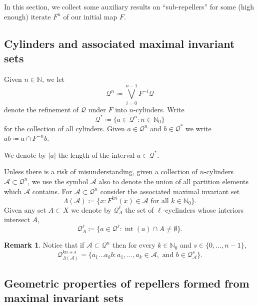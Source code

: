 \documentclass[english, 10pt]{amsart}
\numberwithin{equation}{section}
\theoremstyle{definition}
\theoremstyle{plain}
\theoremstyle{plain}
\theoremstyle{definition}
\newtheorem{remark}[definition]{Remark}
\theoremstyle{definition}
\theoremstyle{plain}
\theoremstyle{definition}
\newcommand{\cA}{{\mathcal A}}
\newcommand{\cQ}{{\mathcal Q}}
\newcommand{\N}{{\mathbb N}}
\newcommand{\eqdef}{\coloneqq}
\newcommand{\bN}{\N}
\newcommand{\intr}{\operatorname{int}}
\numberwithin{equation}{section}
\begin{document}
In this section, we collect some auxiliary results on ``sub-repellers'' for some (high enough) iterate $F^n$ of our initial map $F$.

\subsection{Cylinders and associated maximal invariant sets}

Given $n\in\bN$, we let
\[
	\cQ^{ n } \eqdef \bigvee_{ i = 0 }^{  n - 1 } F^{ -i } \cQ
\]	 
denote the refinement of $\cQ$ under $F$ into $n$-cylinders. Write 
\[
	\cQ^{ * } \eqdef \{ a \in \cQ^{ n } \colon n \in \N_0 \}
\]	 
for the collection of all cylinders.
Given $a \in \cQ^{n}$ and $b\in \cQ^{*}$ we  write $ab \eqdef a \cap F^{-n} b$.

We denote by $|a|$ the length of the interval $a\in\cQ^\ast$.

Unless there is a risk of misunderstanding, given a collection of $n$-cylinders $\cA \subset \cQ^n$, we use the symbol $\cA$ also to denote the union of all partition elements which $\cA$ contains. For $\cA \subset \cQ^n$ consider the associated maximal invariant set 
\begin{equation}\label{eq:def:max-inv-set}
  \Lambda ( \cA ) \coloneqq \{ x \colon F^{kn} (x) \in \cA \text{ for all } k \in\bN_0  \}.
\end{equation}
Given any set $A \subset X$ we denote by $\cQ_{A}^\ell$ the set of $\ell$-cyclinders whose interiors intersect $A$,
\[
  \cQ^{\ell}_A \eqdef
  \big\{ a \in \cQ^\ell \colon \intr(a) \cap A \neq \emptyset \big\}
  .
\]
\begin{remark}\label{rem:ell-cover-lambda}
  Notice that if $\cA \subset \cQ^n$ then for every $k\in\bN_0$ and $s\in\{0,\ldots, n - 1\}$,
  \[
    \cQ_{\Lambda(\cA)}^{kn + s}
    = \big\{ a_1 \ldots a_k b \colon 
    a_1, \ldots, a_k \in \cA,
    \text{ and } b \in \cQ^s_{\cA}  \big\}
    .
  \]
\end{remark}

\subsection{Geometric properties of repellers formed from maximal invariant sets}\label{secprelimrepeller}
\end{document}
